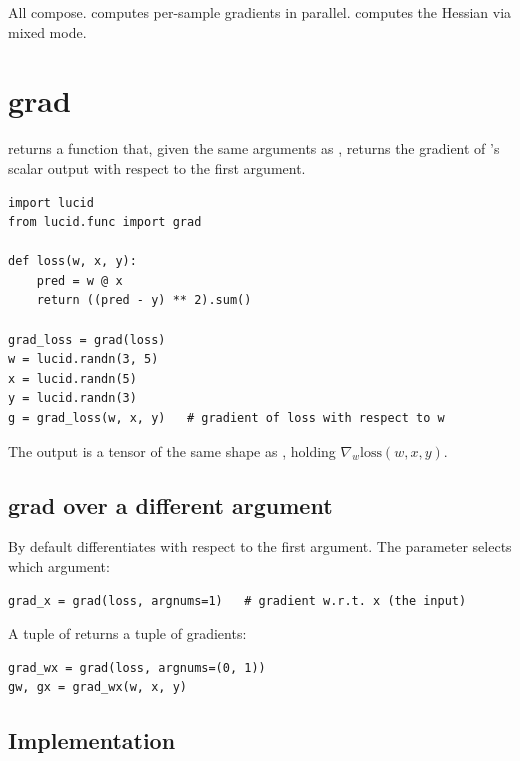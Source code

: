All compose.  computes per-sample gradients
in parallel.  computes the
Hessian via mixed mode.

\section{grad}
\label{sec:higher_order:grad}

 returns a function that, given the same arguments
as , returns the gradient of 's scalar output
with respect to the first argument.

\begin{lstlisting}[style=lucid,language=LucidPython]
import lucid
from lucid.func import grad

def loss(w, x, y):
    pred = w @ x
    return ((pred - y) ** 2).sum()

grad_loss = grad(loss)
w = lucid.randn(3, 5)
x = lucid.randn(5)
y = lucid.randn(3)
g = grad_loss(w, x, y)   # gradient of loss with respect to w
\end{lstlisting}

The output  is a tensor of the same shape as ,
holding $\nabla_w \text{loss}(w, x, y)$.

\subsection{grad over a different argument}
\label{ssec:higher_order:grad_argnum}

By default  differentiates with respect to the first
argument. The  parameter selects which argument:

\begin{lstlisting}[style=lucid,language=LucidPython]
grad_x = grad(loss, argnums=1)   # gradient w.r.t. x (the input)
\end{lstlisting}

A tuple of  returns a tuple of gradients:

\begin{lstlisting}[style=lucid,language=LucidPython]
grad_wx = grad(loss, argnums=(0, 1))
gw, gx = grad_wx(w, x, y)
\end{lstlisting}

\subsection{Implementation}
\label{ssec:higher_order:grad_impl}

